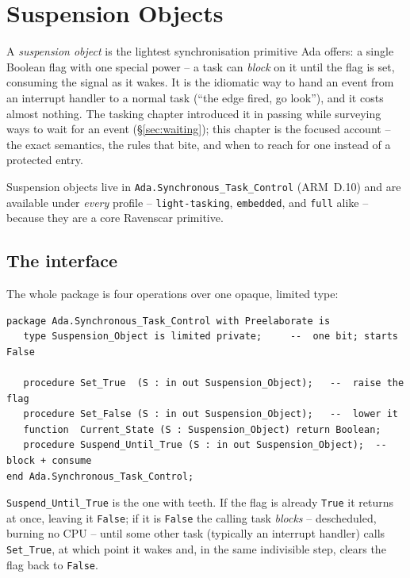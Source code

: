 \chapter{Suspension Objects}
\label{ch:suspension}

A \emph{suspension object} is the lightest synchronisation primitive Ada offers: a
single Boolean flag with one special power -- a task can \emph{block} on it until
the flag is set, consuming the signal as it wakes. It is the idiomatic way to hand
an event from an interrupt handler to a normal task (``the edge fired, go look''),
and it costs almost nothing. The tasking chapter introduced it in passing while
surveying ways to wait for an event (\S\ref{sec:waiting}); this chapter is the
focused account -- the exact semantics, the rules that bite, and when to reach for
one instead of a protected entry.

Suspension objects live in \texttt{Ada.Synchronous\_Task\_Control} (ARM~D.10) and
are available under \emph{every} profile -- \texttt{light-tasking},
\texttt{embedded}, and \texttt{full} alike -- because they are a core Ravenscar
primitive.

\section{The interface}

The whole package is four operations over one opaque, limited type:

\begin{lstlisting}
package Ada.Synchronous_Task_Control with Preelaborate is
   type Suspension_Object is limited private;     --  one bit; starts False

   procedure Set_True  (S : in out Suspension_Object);   --  raise the flag
   procedure Set_False (S : in out Suspension_Object);   --  lower it
   function  Current_State (S : Suspension_Object) return Boolean;
   procedure Suspend_Until_True (S : in out Suspension_Object);  --  block + consume
end Ada.Synchronous_Task_Control;
\end{lstlisting}

\texttt{Suspend\_Until\_True} is the one with teeth. If the flag is already
\texttt{True} it returns at once, leaving it \texttt{False}; if it is \texttt{False}
the calling task \emph{blocks} -- descheduled, burning no CPU -- until some other
task (typically an interrupt handler) calls \texttt{Set\_True}, at which point it
wakes and, in the same indivisible step, clears the flag back to \texttt{False}.

